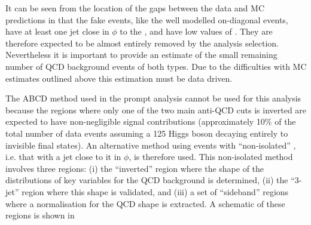 It can be seen from the location of the gaps between the data and \ac{MC} predictions in  that the fake \MET events, like the well modelled on-diagonal events, have at least one jet close in $\phi$ to the \MET, and have low values of \METsig. They are therefore expected to be almost entirely removed by the analysis selection. Nevertheless it is important to provide an estimate of the small remaining number of \ac{QCD} background events of both types. Due to the difficulties with \ac{MC} estimates outlined above this estimation must be data driven.

The ABCD method used in the prompt analysis cannot be used for this analysis because the regions where only one of the two main anti-\ac{QCD} cuts is inverted are expected to have non-negligible signal contributions (approximately 10\% of the total number of data events assuming a 125 \GeV Higgs boson decaying entirely to invisible final states). An alternative method using events with ``non-isolated'' \MET, i.e. that with a jet close to it in $\phi$, is therefore used. This non-isolated method involves three regions: (i) the ``inverted'' region where the shape of the distributions of key variables for the \ac{QCD} background is determined, (ii) the ``3-jet'' region where this shape is validated, and (iii) a set of ``sideband'' regions where a normalisation for the \ac{QCD} shape is extracted. A schematic of these regions is shown in 

